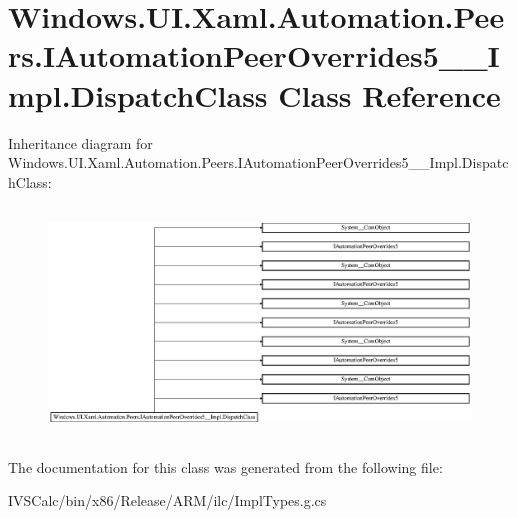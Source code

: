 \hypertarget{class_windows_1_1_u_i_1_1_xaml_1_1_automation_1_1_peers_1_1_i_automation_peer_overrides5_____impl_1_1_dispatch_class}{}\section{Windows.\+U\+I.\+Xaml.\+Automation.\+Peers.\+I\+Automation\+Peer\+Overrides5\+\_\+\+\_\+\+Impl.\+Dispatch\+Class Class Reference}
\label{class_windows_1_1_u_i_1_1_xaml_1_1_automation_1_1_peers_1_1_i_automation_peer_overrides5_____impl_1_1_dispatch_class}
Inheritance diagram for Windows.\+U\+I.\+Xaml.\+Automation.\+Peers.\+I\+Automation\+Peer\+Overrides5\+\_\+\+\_\+\+Impl.\+Dispatch\+Class\+:\begin{figure}[H]
\begin{center}
\leavevmode
\includegraphics[height=6.160000cm]{class_windows_1_1_u_i_1_1_xaml_1_1_automation_1_1_peers_1_1_i_automation_peer_overrides5_____impl_1_1_dispatch_class}
\end{center}
\end{figure}


The documentation for this class was generated from the following file\+:\begin{DoxyCompactItemize}
\item 
I\+V\+S\+Calc/bin/x86/\+Release/\+A\+R\+M/ilc/Impl\+Types.\+g.\+cs\end{DoxyCompactItemize}
